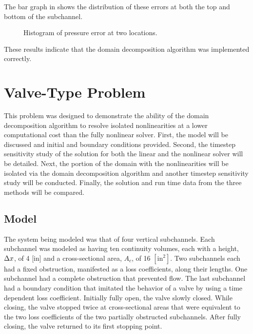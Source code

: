 The bar graph in  shows the distribution of these errors at both the top and bottom of the subchannel.

\begin{figure}[h!tb]
\centering

\caption{Histogram of pressure error at two locations.}
\label{fig:complexBar}
\end{figure}

These results indicate that the domain decomposition algorithm was implemented correctly.

\section{Valve-Type Problem}
\label{sect:valveProblem}

This problem was designed to demonstrate the ability of the domain decomposition algorithm to resolve isolated nonlinearities at a lower computational cost than the fully nonlinear solver. 
First, the model will be discussed and initial and boundary conditions provided.
Second, the timestep sensitivity study of the solution for both the linear and the nonlinear solver will be detailed.
Next, the portion of the domain with the nonlinearities will be isolated via the domain decomposition algorithm and another timestep sensitivity study will be conducted.
Finally, the solution and run time data from the three methods will be compared.

\subsection{Model}
\label{subsect:valveModel}

The system being modeled was that of four vertical subchannels.
Each subchannel was modeled as having ten continuity volumes, each with a height, $\dx{}$, of 4 [in] and a cross-sectional area, $ A_{c} $, of 16 $[\text{in}^{2}]$.
Two subchannels each had a fixed obstruction, manifested as a loss coefficients, along their lengths.
One subchannel had a complete obstruction that prevented flow.
The last subchannel had a boundary condition that imitated the behavior of a valve by using a time dependent loss coefficient.
Initially fully open, the valve slowly closed.
While closing, the valve stopped twice at cross-sectional areas that were equivalent to the two loss coefficients of the two partially obstructed subchannels.
After fully closing, the valve returned to its first stopping point.

